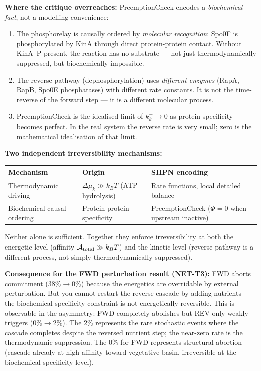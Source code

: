 \documentclass[11pt,a4paper]{article}
\begin{document}
\textbf{Where the critique overreaches:}
PreemptionCheck encodes a \emph{biochemical fact}, not a modelling
convenience:
\begin{enumerate}
  \item The phosphorelay is causally ordered by \emph{molecular recognition}:
    Spo0F is phosphorylated by KinA through direct protein-protein contact.
    Without KinA~P present, the reaction has no substrate — not just
    thermodynamically suppressed, but biochemically impossible.
  \item The reverse pathway (dephosphorylation) uses \emph{different enzymes}
    (RapA, RapB, Spo0E phosphatases) with different rate constants.
    It is not the time-reverse of the forward step — it is a
    different molecular process.
  \item PreemptionCheck is the idealised limit of $k^-_k \to 0$ as
    protein specificity becomes perfect.
    In the real system the reverse rate is very small; zero is the
    mathematical idealisation of that limit.
\end{enumerate}

\textbf{Two independent irreversibility mechanisms:}
\begin{center}
\begin{tabular}{lll}
\hline
Mechanism & Origin & SHPN encoding \\
\hline
Thermodynamic driving & $\Delta\mu_k \gg k_BT$ (ATP hydrolysis) &
  Rate functions, local detailed balance \\
Biochemical causal ordering & Protein-protein specificity &
  PreemptionCheck ($\Phi = 0$ when upstream inactive) \\
\hline
\end{tabular}
\end{center}

Neither alone is sufficient. Together they enforce irreversibility at
both the energetic level (affinity $\mathcal{A}_{\rm total} \gg k_BT$)
and the kinetic level (reverse pathway is a different process, not
simply thermodynamically suppressed).

\textbf{Consequence for the FWD perturbation result (NET-T3):}
FWD aborts commitment ($38\% \to 0\%$) because the energetics are
overridable by external perturbation.
But you cannot restart the reverse cascade by adding nutrients —
the biochemical specificity constraint is not energetically reversible.
This is observable in the asymmetry: FWD completely abolishes but REV
only weakly triggers ($0\% \to 2\%$).
The 2\% represents the rare stochastic events where the cascade
completes despite the reversed nutrient step; the near-zero rate is
the thermodynamic suppression.
The 0\% for FWD represents structural abortion (cascade already at
high affinity toward vegetative basin, irreversible at the biochemical
specificity level).
\end{document}
